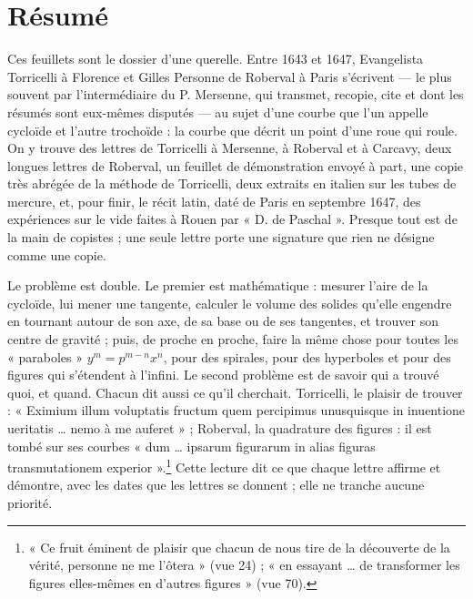 \documentclass[11pt,a4paper]{article}
\begin{document}
\section*{Résumé}

\begin{resume}
Ces feuillets sont le dossier d'une querelle. Entre 1643 et 1647, Evangelista
Torricelli à Florence et Gilles Personne de Roberval à Paris s'écrivent — le
plus souvent par l'intermédiaire du P. Mersenne, qui transmet, recopie, cite et
dont les résumés sont eux-mêmes disputés — au sujet d'une courbe que l'un appelle cycloïde et
l'autre trochoïde : la courbe que décrit un point d'une roue qui roule. On y
trouve des lettres de Torricelli à Mersenne, à Roberval et à Carcavy, deux
longues lettres de Roberval, un feuillet de démonstration envoyé à part, une
copie très abrégée de la méthode de Torricelli, deux extraits en italien sur les
tubes de mercure, et, pour finir, le récit latin, daté de Paris en septembre
1647, des expériences sur le vide faites à Rouen par « D. de Paschal ». Presque
tout est de la main de copistes ; une seule lettre porte une signature que rien
ne désigne comme une copie.

Le problème est double. Le premier est mathématique : mesurer l'aire de la
cycloïde, lui mener une tangente, calculer le volume des solides qu'elle engendre
en tournant autour de son axe, de sa base ou de ses tangentes, et trouver son
centre de gravité ; puis, de proche en proche, faire la même chose pour toutes
les « paraboles » $y^m = p^{m-n}x^n$, pour des spirales, pour des hyperboles et
pour des figures qui s'étendent à l'infini. Le second problème est de savoir qui
a trouvé quoi, et quand. Chacun dit aussi ce qu'il cherchait. Torricelli, le
plaisir de trouver : « Eximium illum voluptatis fructum quem percipimus
unusquisque in inuentione ueritatis \ldots{} nemo à me auferet » ; Roberval, la
quadrature des figures : il est tombé sur ses courbes « dum \ldots{} ipsarum
figurarum in alias figuras transmutationem experior ».\footnote{« Ce fruit
éminent de plaisir que chacun de nous tire de la découverte de la vérité,
personne ne me l'ôtera » (vue 24) ; « en essayant \ldots{} de transformer les figures elles-mêmes en d'autres figures » (vue 70).} Cette
lecture dit ce que chaque lettre affirme et démontre, avec les dates que les
lettres se donnent ; elle ne tranche aucune priorité.


\end{resume}
\end{document}
